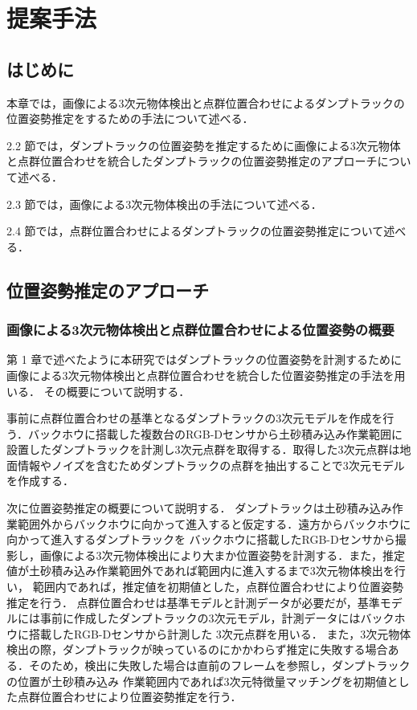 \chapter{提案手法}
\thispagestyle{empty}
\label{chap2}
\minitoc

\newpage
\section{はじめに}
本章では，画像による3次元物体検出と点群位置合わせによるダンプトラックの位置姿勢推定をするための手法について述べる．
\par
2.2 節では，ダンプトラックの位置姿勢を推定するために画像による3次元物体と点群位置合わせを統合したダンプトラックの位置姿勢推定のアプローチについて述べる．
\par
2.3 節では，画像による3次元物体検出の手法について述べる．
\par
2.4 節では，点群位置合わせによるダンプトラックの位置姿勢推定について述べる．
\newpage

\section{位置姿勢推定のアプローチ}
\subsection{画像による3次元物体検出と点群位置合わせによる位置姿勢の概要}
第 1 章で述べたように本研究ではダンプトラックの位置姿勢を計測するために画像による3次元物体検出と点群位置合わせを統合した位置姿勢推定の手法を用いる．
その概要について説明する．
\par
事前に点群位置合わせの基準となるダンプトラックの3次元モデルを作成を行う．バックホウに搭載した複数台のRGB-Dセンサから土砂積み込み作業範囲に
設置したダンプトラックを計測し3次元点群を取得する．取得した3次元点群は地面情報やノイズを含むためダンプトラックの点群を抽出することで3次元モデルを作成する．
\par
次に位置姿勢推定の概要について説明する．
ダンプトラックは土砂積み込み作業範囲外からバックホウに向かって進入すると仮定する．遠方からバックホウに向かって進入するダンプトラックを
バックホウに搭載したRGB-Dセンサから撮影し，画像による3次元物体検出により大まか位置姿勢を計測する．また，推定値が土砂積み込み作業範囲外であれば範囲内に進入するまで3次元物体検出を行い，
範囲内であれば，推定値を初期値とした，点群位置合わせにより位置姿勢推定を行う．
点群位置合わせは基準モデルと計測データが必要だが，基準モデルには事前に作成したダンプトラックの3次元モデル，計測データにはバックホウに搭載したRGB-Dセンサから計測した
3次元点群を用いる．
また，3次元物体検出の際，ダンプトラックが映っているのにかかわらず推定に失敗する場合ある．そのため，検出に失敗した場合は直前のフレームを参照し，ダンプトラックの位置が土砂積み込み
作業範囲内であれば3次元特徴量マッチングを初期値とした点群位置合わせにより位置姿勢推定を行う．
\newpage
